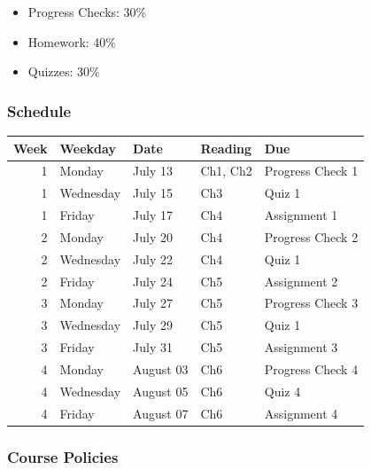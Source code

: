 \documentclass[
]{article}
\providecommand{\tightlist}{%
  \setlength{\itemsep}{0pt}\setlength{\parskip}{0pt}}
\begin{document}
\begin{itemize}
  \begin{itemize}
  \tightlist
  \item
    Progress Checks: 30\%
  \item
    Homework: 40\%
  \item
    Quizzes: 30\%
  \end{itemize}
\end{itemize}

\hypertarget{schedule}{%
\subsubsection{Schedule}\label{schedule}}

\begin{table}[H]
\centering
\begin{tabular}{r|l|l|l|l}
\hline
Week & Weekday & Date & Reading & Due\\
\hline
1 & Monday & July 13 & Ch1, Ch2 & Progress Check 1\\
\hline
1 & Wednesday & July 15 & Ch3 & Quiz 1\\
\hline
1 & Friday & July 17 & Ch4 & Assignment 1\\
\hline
2 & Monday & July 20 & Ch4 & Progress Check 2\\
\hline
2 & Wednesday & July 22 & Ch4 & Quiz 1\\
\hline
2 & Friday & July 24 & Ch5 & Assignment 2\\
\hline
3 & Monday & July 27 & Ch5 & Progress Check 3\\
\hline
3 & Wednesday & July 29 & Ch5 & Quiz 1\\
\hline
3 & Friday & July 31 & Ch5 & Assignment 3\\
\hline
4 & Monday & August 03 & Ch6 & Progress Check 4\\
\hline
4 & Wednesday & August 05 & Ch6 & Quiz 4\\
\hline
4 & Friday & August 07 & Ch6 & Assignment 4\\
\hline
\end{tabular}
\end{table}

\hypertarget{course-policies}{%
\subsubsection{Course Policies}\label{course-policies}}
\end{document}
